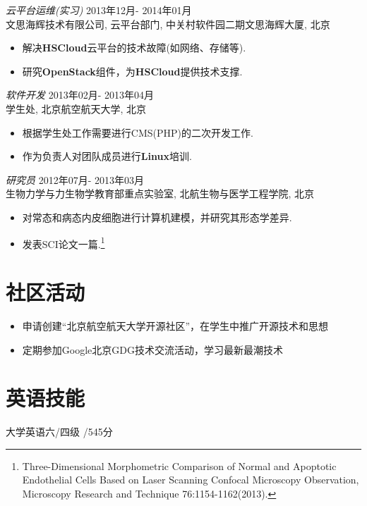 \documentclass[a4paper,margin]{res}
\begin{document}
\begin{resume}
					  {\sl 云平台运维(实习)} \hfill 2013年12月- 2014年01月 \\
                \indent 文思海辉技术有限公司, 
                云平台部门, 中关村软件园二期文思海辉大厦, 北京 
                 \begin{itemize}  \itemsep -2pt %
                \item  解决{\bf HSCloud}云平台的技术故障(如网络、存储等).
                \item  研究{\bf OpenStack}组件，为{\bf HSCloud}提供技术支撑. 
                \end{itemize}
                
                {\sl 软件开发} \hfill 2013年02月- 2013年04月 \\
                \indent 学生处, 北京航空航天大学, 北京
                \begin{itemize}
                \item  根据学生处工作需要进行CMS(PHP)的二次开发工作.
                \item  作为负责人对团队成员进行{\bf Linux}培训.
                \end{itemize}
 
                {\sl 研究员} \hfill 2012年07月- 2013年03月 \\
               	\indent 生物力学与力生物学教育部重点实验室, 北航生物与医学工程学院, 北京
                 \begin{itemize}  \itemsep -2pt %
                 \item  对常态和病态内皮细胞进行计算机建模，并研究其形态学差异.
                 \item  发表SCI论文一篇.\footnote{Three-Dimensional Morphometric Comparison of Normal and Apoptotic Endothelial Cells Based on Laser Scanning Confocal Microscopy Observation, Microscopy Research and Technique 76:1154-1162(2013).}
                 \end{itemize} 
 
\section{社区活动}  \begin{itemize}
						 \item  申请创建``北京航空航天大学开源社区''，在学生中推广开源技术和思想
						 \item  定期参加Google北京GDG技术交流活动，学习最新最潮技术
						 \end{itemize}
						 
\section{英语技能}  大学英语六/四级 \quad{}/545分

\end{resume}
\end{document}
